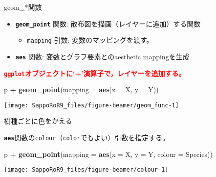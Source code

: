 \documentclass[ignorenonframetext,]{beamer}
\newenvironment{Shaded}{\begin{snugshade}}{\end{snugshade}}
\newcommand{\KeywordTok}[1]{\textcolor[rgb]{0.13,0.29,0.53}{\textbf{#1}}}
\newcommand{\DataTypeTok}[1]{\textcolor[rgb]{0.13,0.29,0.53}{#1}}
\newcommand{\StringTok}[1]{\textcolor[rgb]{0.31,0.60,0.02}{#1}}
\newcommand{\OperatorTok}[1]{\textcolor[rgb]{0.81,0.36,0.00}{\textbf{#1}}}
\newcommand{\NormalTok}[1]{#1}
\providecommand{\tightlist}{%
  \setlength{\itemsep}{0pt}\setlength{\parskip}{0pt}}
\let\oldShaded\Shaded
\let\endoldShaded\endShaded
\renewenvironment{Shaded}{\footnotesize\oldShaded}{\endoldShaded}
\begin{document}
\begin{frame}[fragile]{geom\_*関数}

\begin{itemize}
\tightlist
\item
  \textbf{\texttt{geom\_point}} 関数:
  散布図を描画（レイヤーに追加）する関数

  \begin{itemize}
  \tightlist
  \item
    \texttt{mapping} 引数: 変数のマッピングを渡す。
  \end{itemize}
\item
  \textbf{\texttt{aes}} 関数: 変数とグラフ要素とのaesthetic
  mappingを生成
\end{itemize}

\textcolor{red}{\bfseries \texttt{ggplot}オブジェクトに`+'演算子で，レイヤーを追加する。}

\begin{Shaded}
\begin{Highlighting}[]
\NormalTok{p }\OperatorTok{+}\StringTok{ }\KeywordTok{geom_point}\NormalTok{(}\DataTypeTok{mapping =} \KeywordTok{aes}\NormalTok{(}\DataTypeTok{x =}\NormalTok{ X, }\DataTypeTok{y =}\NormalTok{ Y))}
\end{Highlighting}
\end{Shaded}

\texttt{[image: SappoRoR9\_files/figure-beamer/geom\_func-1]}

\end{frame}

\begin{frame}[fragile]{樹種ごとに色をかえる}

\textbf{\texttt{aes}}関数の\texttt{colour}（\texttt{color}でもよい）引数を指定する。

\begin{Shaded}
\begin{Highlighting}[]
\NormalTok{p }\OperatorTok{+}\StringTok{ }\KeywordTok{geom_point}\NormalTok{(}\DataTypeTok{mapping =} \KeywordTok{aes}\NormalTok{(}\DataTypeTok{x =}\NormalTok{ X, }\DataTypeTok{y =}\NormalTok{ Y, }\DataTypeTok{colour =}\NormalTok{ Species))}
\end{Highlighting}
\end{Shaded}

\texttt{[image: SappoRoR9\_files/figure-beamer/colour-1]}

\end{frame}
\end{document}

